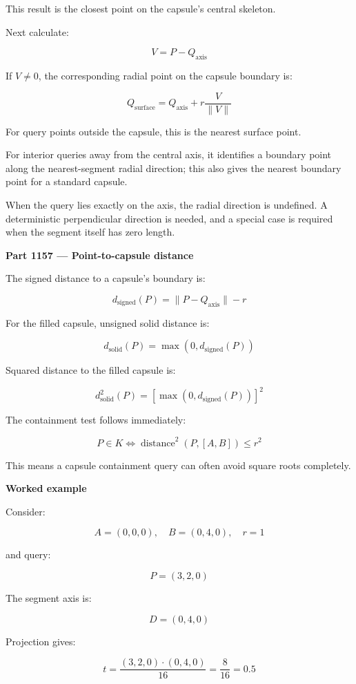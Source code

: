 This result is the closest point on the capsule's central skeleton.

Next calculate:

\[
V=P-Q_{\mathrm{axis}}
\]

If \(V\ne0\), the corresponding radial point on the capsule boundary is:

\[
\boxed{ Q_{\mathrm{surface}} = Q_{\mathrm{axis}} + r\frac{V}{\|V\|} }
\]

For query points outside the capsule, this is the nearest surface point.

For interior queries away from the central axis, it identifies a boundary point along the nearest-segment radial direction; this also gives the nearest boundary point for a standard capsule.

When the query lies exactly on the axis, the radial direction is undefined. A deterministic perpendicular direction is needed, and a special case is required when the segment itself has zero length.

\textbf{Part 1157 --- Point-to-capsule distance}

The signed distance to a capsule's boundary is:

\[
\boxed{ d_{\mathrm{signed}}(P)= \|P-Q_{\mathrm{axis}}\|-r }
\]

For the filled capsule, unsigned solid distance is:

\[
\boxed{ d_{\mathrm{solid}}(P)= \max(0,d_{\mathrm{signed}}(P)) }
\]

Squared distance to the filled capsule is:

\[
\boxed{ d_{\mathrm{solid}}^2(P)= \left[\max(0,d_{\mathrm{signed}}(P))\right]^2 }
\]

The containment test follows immediately:

\[
\boxed{ P\in K \iff \operatorname{distance}^2(P,[A,B])\le r^2 }
\]

This means a capsule containment query can often avoid square roots completely.

\textbf{Worked example}

Consider:

\[
A=(0,0,0),\quad B=(0,4,0),\quad r=1
\]

and query:

\[
P=(3,2,0)
\]

The segment axis is:

\[
D=(0,4,0)
\]

Projection gives:

\[
t=\frac{(3,2,0)\cdot(0,4,0)}{16} =\frac{8}{16}=0.5
\]

